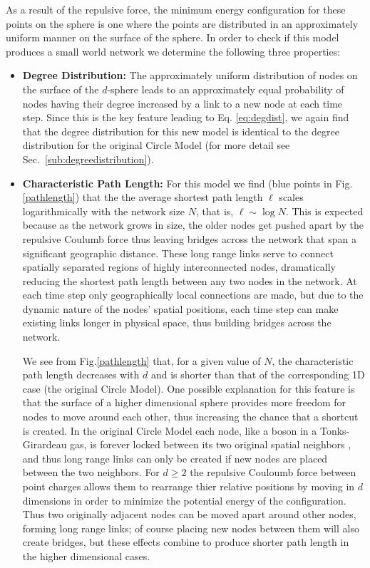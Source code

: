 \documentclass[aps,pre,reprint,superscriptaddress,amsmath,amssymb,nofootinbib]{revtex4-1}
\begin{document}
As a result of the repulsive force, the minimum energy configuration for these points on the sphere is one where the points are distributed in an approximately uniform manner on the surface of the sphere.
In order to check if this model produces a small world network we determine the following three properties:
\begin{itemize}
  \item \textbf{Degree Distribution:} The approximately uniform distribution of nodes on the surface of the $d$-sphere leads to an approximately equal probability of nodes having their degree increased by a link to a new node at each time step.
Since this is the key feature leading to Eq. \eqref{eq:degdist}, we again find that the degree distribution for this new model is identical to the degree distribution for the original Circle Model (for more detail see Sec.~\ref{sub:degreedistribution}).
  \item \textbf{Characteristic Path Length:} For this model we find (blue points in Fig.\ref{pathlength}) that the the average shortest path length $\ell$ scales logarithmically with the network size $N$, that is, $\ell \sim \log N$. 
This is expected because as the network grows in size, the older nodes get pushed apart by the repulsive Coulumb force thus leaving bridges across the network that span a significant geographic distance.
These long range links serve to connect spatially separated regions of highly interconnected nodes, dramatically reducing the shortest path length between any two nodes in the network.
At each time step only geographically local connections are made, but due to the dynamic nature of the nodes' spatial positions, each time step can make existing links longer in physical space, thus building bridges across the network.

\indent We see from Fig.\ref{pathlength} that, for a given value of $N$, the characteristic path length decreases with $d$ and is shorter than that of the corresponding 1D case (the original Circle Model).
One possible explanation for this feature is that the surface of a higher dimensional sphere provides more freedom for nodes to move around each other, thus increasing the chance that a shortcut is created.
In the original Circle Model each node, like a boson in a Tonks-Girardeau gas, is forever locked between its two original spatial neighbors \cite{girardeau}, and thus long range links can only be created if new nodes are placed between the two neighbors.
For $d \geq 2$ the repulsive Couloumb force between point charges allows them to rearrange thier relative positions by moving in $d$ dimensions in order to minimize the potential energy of the configuration.
Thus two originally adjacent nodes can be moved apart around other nodes, forming long range links; of course placing new nodes between them will also create bridges, but these effects combine to produce shorter path length in the higher dimensional cases.


\end{itemize}
\end{document}
